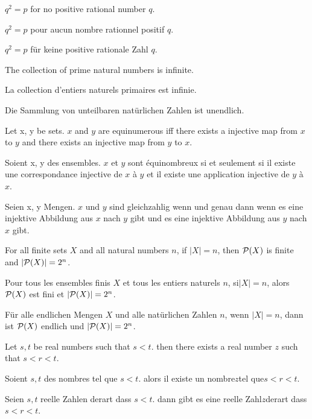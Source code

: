 \documentclass{article}
\begin{document}
\setlength\parindent{0pt}

\newcommand{\Prod}[3]{#1_{#2} \cdots #1_{#3}}
\newcommand{\Seq}[2]{\{#1,\dots,#2\}}
\newcommand{\FinSet}[3]{\{#1_{#2},\dots,#1_{#3}\}}
\newcommand{\Primes}{\mathbb{P}}
\newcommand{\pow}{{\cal P}}
\newcommand{\range}{\operatorname{ran}}
\newcommand{\inv}[1]{#1^{-1}}
\newcommand{\sset}[2]{\{#1\}_{#2}}
\newcommand{\sumgeom}[2]{\sum_{0 \leq i < #2} {#1}^i}
\newcommand{\sumarith}[3]{\sum_{i = 1}^{#3}(#1 + #2 \cdot i)}

 $q^{2} = p$ for no positive rational number $q$.

 $q^{2} = p$ pour aucun nombre rationnel positif $q $.

 $q^{2} = p$ für keine positive rationale Zahl $q $.


The collection of prime natural numbers is infinite.

La collection d'entiers naturels primaires est infinie.

Die Sammlung von unteilbaren natürlichen Zahlen ist unendlich.


Let x, y be sets. $x$ and $y$ are equinumerous iff there exists a injective map from $x$ to $y$ and there exists an injective map from $y$ to $x$.

Soient x, y des ensembles. $x$ et $y$ sont équinombreux si et seulement si il existe une correspondance injective de $x$ à $y$ et il existe une application injective de $y$ à $x $.

Seien x, y Mengen. $x$ und $y$ sind gleichzahlig wenn und genau dann wenn es eine injektive Abbildung aus $x$ nach $y$ gibt und es eine injektive Abbildung aus $y$ nach $x$ gibt.


For all finite sets $X$ and all natural numbers $n$, if $|X| = n$, then $\pow(X)$ is finite and $|\pow(X)| = 2^{n}$.

Pour tous les ensembles finis $X$ et tous les entiers naturels $n $, si$ |X| = n $, alors $\pow(X)$ est fini et $|\pow(X)| = 2^{n} $.

Für alle endlichen Mengen $X$ und alle natürlichen Zahlen $n$, wenn $|X| = n$, dann ist $\pow(X)$ endlich und $|\pow(X)| = 2^{n} $.


Let $s , t$ be real numbers such that $s < t$. then there exists a real number $z$ such that $s < r < t$.

Soient $s , t$ des nombres tel que $s < t $. alors il existe un nombre$ z $tel que$ s < r < t $.

Seien $s , t$ reelle Zahlen derart dass $s < t $. dann gibt es eine reelle Zahl$ z $derart dass$ s < r < t $.
\end{document}
